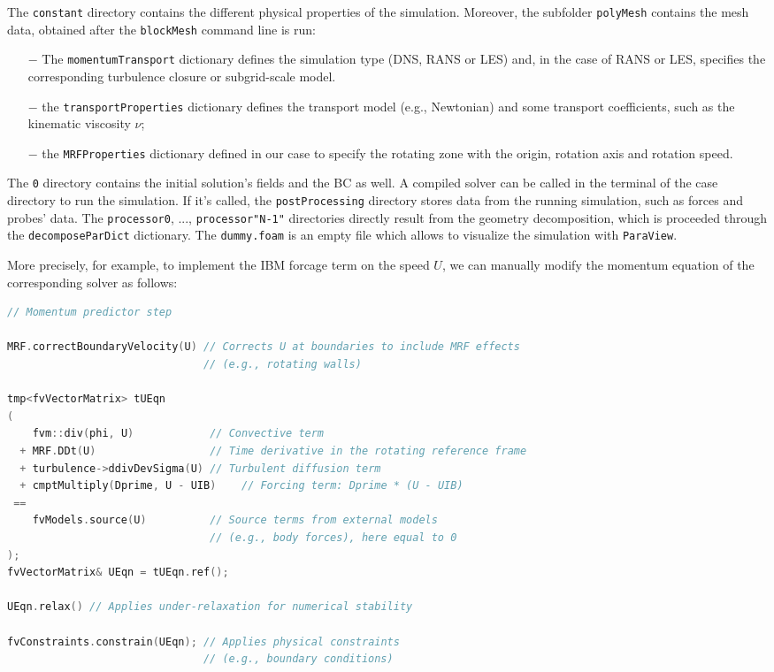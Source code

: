 The \texttt{constant} directory contains the different physical properties of the simulation. Moreover, the subfolder \texttt{polyMesh} contains the mesh data, obtained after the \texttt{blockMesh} command line is run:
\begin{itemize}
    \item[$-$] The \texttt{momentumTransport} dictionary defines the simulation type (DNS, RANS or LES) and, in the case of RANS or LES, specifies the corresponding turbulence closure or subgrid-scale model.
    \item[$-$] the \texttt{transportProperties} dictionary defines the transport model (e.g., Newtonian) and some transport coefficients, such as the kinematic viscosity $\nu$;
    \item[$-$] the \texttt{MRFProperties} dictionary defined in our case to specify the rotating zone with the origin, rotation axis and rotation speed.
\end{itemize}

The \texttt{0} directory contains the initial solution's fields and the \ac{BC} as well.
A compiled solver can be called in the terminal of the case directory to run the simulation.
If it's called, the \texttt{postProcessing} directory stores data from the running simulation, such as forces and probes' data.
The \texttt{processor0}, ..., \texttt{processor"N-1"} directories directly result from the geometry decomposition, which is proceeded through the \texttt{decomposeParDict} dictionary.
The \texttt{dummy.foam} is an empty file which allows to visualize the simulation with \texttt{ParaView}. 


More precisely, for example, to implement the IBM forcage term on the speed $U$, we can manually modify the momentum equation of the corresponding solver as follows:
\begin{lstlisting}[language=C++]
// Momentum predictor step

MRF.correctBoundaryVelocity(U) // Corrects U at boundaries to include MRF effects
                               // (e.g., rotating walls)

tmp<fvVectorMatrix> tUEqn
(
    fvm::div(phi, U)            // Convective term
  + MRF.DDt(U)                  // Time derivative in the rotating reference frame
  + turbulence->ddivDevSigma(U) // Turbulent diffusion term
  + cmptMultiply(Dprime, U - UIB)    // Forcing term: Dprime * (U - UIB)
 ==
    fvModels.source(U)          // Source terms from external models
                                // (e.g., body forces), here equal to 0
);
fvVectorMatrix& UEqn = tUEqn.ref();

UEqn.relax() // Applies under-relaxation for numerical stability

fvConstraints.constrain(UEqn); // Applies physical constraints
                               // (e.g., boundary conditions)
\end{lstlisting}

